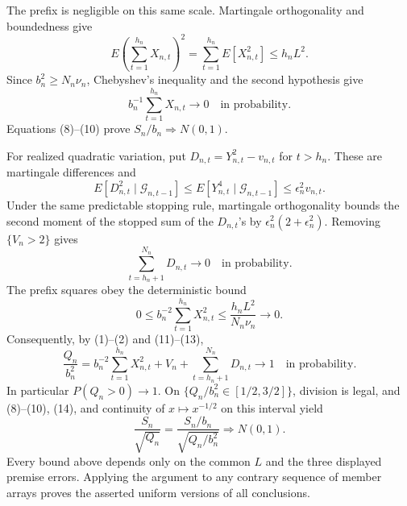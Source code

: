 The prefix is negligible on this same scale.  Martingale orthogonality and
boundedness give
\[
 E\left(\sum_{t=1}^{h_n}X_{n,t}\right)^2
 =\sum_{t=1}^{h_n}E[X_{n,t}^2]\le h_nL^2.
\tag{9}
\]
Since \(b_n^2\ge N_n\nu_n\), Chebyshev's inequality and the second
hypothesis give
\[
 b_n^{-1}\sum_{t=1}^{h_n}X_{n,t}\longrightarrow0
 \quad\text{in probability}.
\tag{10}
\]
Equations (8)--(10) prove \(S_n/b_n\Rightarrow N(0,1)\).

For realized quadratic variation, put
\(D_{n,t}=Y_{n,t}^2-v_{n,t}\) for \(t>h_n\).  These are martingale
differences and
\[
 E[D_{n,t}^2\mid\mathcal G_{n,t-1}]
 \le E[Y_{n,t}^4\mid\mathcal G_{n,t-1}]
 \le\epsilon_n^2v_{n,t}.
\tag{11}
\]
Under the same predictable stopping rule, martingale orthogonality bounds the
second moment of the stopped sum of the \(D_{n,t}\)'s by
\(\epsilon_n^2(2+\epsilon_n^2)\).  Removing \(\{V_n>2\}\) gives
\[
 \sum_{t=h_n+1}^{N_n}D_{n,t}\longrightarrow0
 \quad\text{in probability}.
\tag{12}
\]
The prefix squares obey the deterministic bound
\[
 0\le b_n^{-2}\sum_{t=1}^{h_n}X_{n,t}^2
 \le\frac{h_nL^2}{N_n\nu_n}\longrightarrow0.
\tag{13}
\]
Consequently, by (1)--(2) and (11)--(13),
\[
 \frac{Q_n}{b_n^2}
 =b_n^{-2}\sum_{t=1}^{h_n}X_{n,t}^2+V_n
 +\sum_{t=h_n+1}^{N_n}D_{n,t}
 \longrightarrow1
 \quad\text{in probability}.
\tag{14}
\]
In particular \(P(Q_n>0)\to1\).  On
\(\{Q_n/b_n^2\in[1/2,3/2]\}\), division is legal, and (8)--(10), (14),
and continuity of \(x\mapsto x^{-1/2}\) on this interval yield
\[
 \frac{S_n}{\sqrt{Q_n}}
 =\frac{S_n/b_n}{\sqrt{Q_n/b_n^2}}\Rightarrow N(0,1).
\tag{15}
\]
Every bound above depends only on the common \(L\) and the three displayed
premise errors.  Applying the argument to any contrary sequence of member
arrays proves the asserted uniform versions of all conclusions.